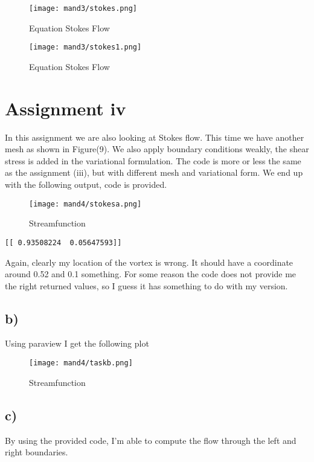 \documentclass[a4paper,norsk]{article}
\begin{document}
\begin{figure}[h!]	
	\centering
	\caption*{Equation Stokes Flow}
	\texttt{[image: mand3/stokes.png]}
\end{figure}
\newpage
\begin{figure}[h!]	
	\centering
	\caption*{Equation Stokes Flow}
	\texttt{[image: mand3/stokes1.png]}
\end{figure}



\newpage{}


\section*{Assignment iv}
In this assignment we are also looking at Stokes flow. This time we have another mesh as shown in Figure(9). We also apply boundary conditions weakly, the shear stress is added in the variational formulation. The code is more or less the same as the assignment (iii), but with different mesh and variational form. We end up with the following output, code is provided.

\begin{figure}[h!]	
	\centering
	\caption*{Streamfunction}
	\texttt{[image: mand4/stokesa.png]}
\end{figure}

\begin{lstlisting}[style=terminal]
[[ 0.93508224  0.05647593]]
\end{lstlisting}
Again, clearly my location of the vortex is wrong. It should have a coordinate around 0.52 and 0.1 something. For some reason the code does not provide me the right returned values, so I guess it has something to do with my version.


\subsection*{b)}
Using paraview I get the following plot
\begin{figure}[h!]	
	\centering
	\caption*{Streamfunction}
	\texttt{[image: mand4/taskb.png]}
\end{figure}
\newpage

\subsection*{c)}
By using the provided code, I'm able to compute the flow through the left and right boundaries.
\end{document}
